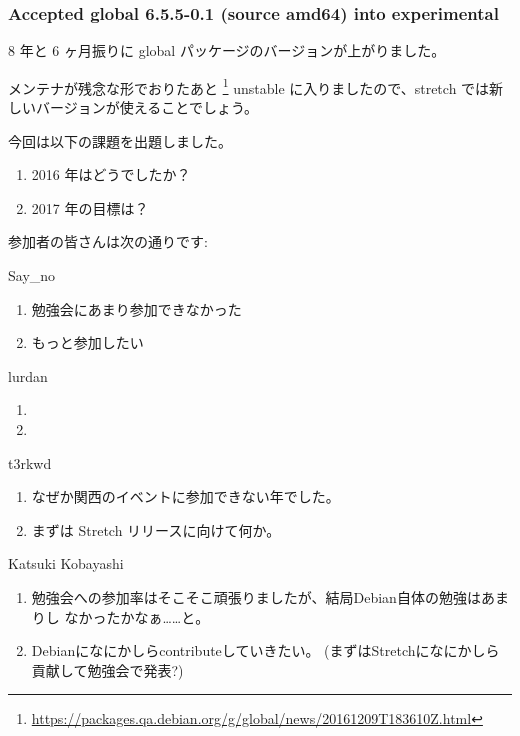 \documentclass[mingoth,a4paper]{jsarticle}
\begin{document}
\subsubsection{Accepted global 6.5.5-0.1 (source amd64) into experimental}

8 年と 6 ヶ月振りに global パッケージのバージョンが上がりました。

メンテナが残念な形でおりたあと
\footnote{\url{https://packages.qa.debian.org/g/global/news/20161209T183610Z.html}}
unstable に入りましたので、stretch では新しいバージョンが使えることでしょう。



今回は以下の課題を出題しました。
\begin{screen}
  \begin{enumerate}
  \item 2016 年はどうでしたか？
  \item 2017 年の目標は？
  \end{enumerate}
\end{screen}

参加者の皆さんは次の通りです:

\begin{prework}{ Say\_no }
  \begin{enumerate}
  \item 勉強会にあまり参加できなかった
  \item もっと参加したい
  \end{enumerate}
\end{prework}

\begin{prework}{ lurdan }
  \begin{enumerate}
  \item
  \item
  \end{enumerate}
\end{prework}

\begin{prework}{ t3rkwd }
  \begin{enumerate}
  \item なぜか関西のイベントに参加できない年でした。
  \item まずは Stretch リリースに向けて何か。
  \end{enumerate}
\end{prework}

\begin{prework}{ Katsuki Kobayashi }
  \begin{enumerate}
  \item 勉強会への参加率はそこそこ頑張りましたが、結局Debian自体の勉強はあまりし
    なかったかなぁ……と。
  \item Debianになにかしらcontributeしていきたい。
    (まずはStretchになにかしら貢献して勉強会で発表?)
  \end{enumerate}
\end{prework}
\end{document}
